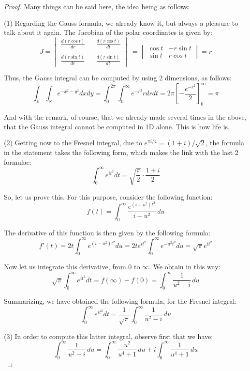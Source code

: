 \documentclass[12pt]{amsbook}
\begin{document}
\begin{proof}
Many things can be said here, the idea being as follows:

\medskip

(1) Regarding the Gauss formula, we already know it, but always a pleasure to talk about it again. The Jacobian of the polar coordinates is given by:
$$J=\begin{vmatrix}
\frac{d(r\cos t)}{dr}&&\frac{d(r\cos t)}{dt}\\
\\
\frac{d(r\sin t)}{dr}&&\frac{d(r\sin t)}{dt}
\end{vmatrix}\
=\begin{vmatrix}
\cos t&-r\sin t\\
\sin t&r\cos t
\end{vmatrix}
=r$$

Thus, the Gauss integral can be computed by using 2 dimensions, as follows:
$$\int_\mathbb R\int_\mathbb Re^{-x^2-y^2}dxdy
=\int_0^{2\pi}\int_0^\infty e^{-r^2}rdrdt
=2\pi\left[-\frac{e^{-r^2}}{2}\right]_0^\infty
=\pi$$

And with the remark, of course, that we already made several times in the above, that the Gauss integral cannot be computed in 1D alone. This is how life is.

\medskip

(2) Getting now to the Fresnel integral, due to $e^{\pi i/4}=(1+i)/\sqrt{2}$, the formula in the statement takes the following form, which makes the link with the last 2 formulae:
$$\int_0^\infty e^{it^2}dt=\sqrt{\frac{\pi}{2}}\cdot\frac{1+i}{2}$$

So, let us prove this. For this purpose, consider the following function:
$$f(t)=\int_0^\infty\frac{e^{(i-u^2)t^2}}{i-u^2}\,du$$

The derivative of this function is then given by the following formula:
$$f'(t)
=2t\int_0^\infty e^{(i-u^2)t^2}du
=2te^{it^2}\int_0^\infty e^{-u^2t^2}du
=\sqrt{\pi}e^{it^2}$$

Now let us integrate this derivative, from 0 to $\infty$. We obtain in this way:
$$\sqrt{\pi}\int_0^\infty e^{it^2}dt
=f(\infty)-f(0)
=\int_0^\infty\frac{1}{u^2-i}\,du$$

Summarizing, we have obtained the following formula, for the Fresnel integral:
$$\int_0^\infty e^{it^2}dt=\frac{1}{\sqrt{\pi}}\int_0^\infty\frac{1}{u^2-i}\,du$$

(3) In order to compute this latter integral, observe first that we have:
$$\int_0^\infty\frac{1}{u^2-i}\,du
=\int_0^\infty\frac{u^2}{u^4+1}\,du+i\int_0^\infty\frac{1}{u^4+1}\,du$$


\end{proof}
\end{document}
